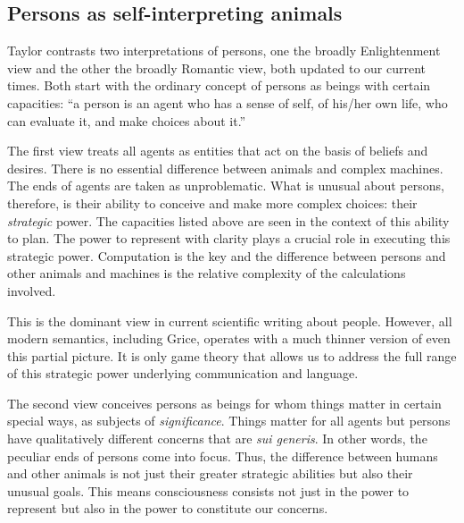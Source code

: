\subsection{Persons as self-interpreting animals}

Taylor contrasts two interpretations of persons, one the broadly Enlightenment view and the other the broadly Romantic view, both updated to our current times. Both start with the ordinary concept of persons as beings with certain capacities: ``a person is an agent who has a sense of self, of his/her own life, who can evaluate it, and make choices about it.'' \citep[103]{taylor:cp}

The first view treats all agents as entities that act on the basis of beliefs and desires. There is no essential difference between animals and complex machines. The ends of agents are taken as unproblematic. What is unusual about persons, therefore, is their ability to conceive and make more complex choices: their \emph{strategic} power. The capacities listed above are seen in the context of this ability to plan. The power to represent with clarity plays a crucial role in executing this strategic power. Computation is the key and the difference between persons and other animals and machines is the relative complexity of the calculations involved.

This is the dominant view in current scientific writing about people. However, all modern semantics, including Grice, operates with a much thinner version of even this partial picture. It is only game theory that allows us to address the full range of this strategic power underlying communication and language.

The second view conceives persons as beings for whom things matter in certain special ways, as subjects of \emph{significance}. Things matter for all agents but persons have qualitatively different concerns that are \emph{sui generis}. In other words, the peculiar ends of persons come into focus. Thus, the difference between humans and other animals is not just their greater strategic abilities but also their unusual goals. This means consciousness consists not just in the power to represent but also in the power to constitute our concerns.

